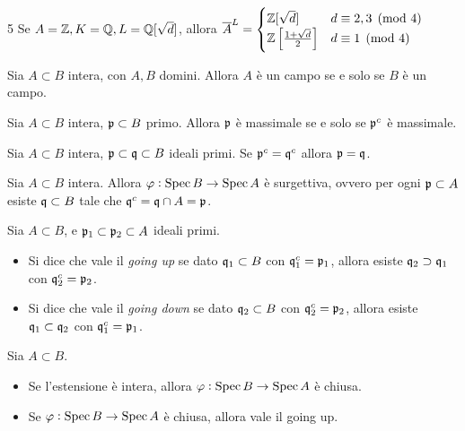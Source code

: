 \begin{example}
5    Se $A=\mathbb{Z}, K=\mathbb{Q}, L=\mathbb{Q}[\sqrt d]$, allora $\overline{A}^L=\begin{cases}
    \mathbb{Z}[\sqrt d] & d\equiv 2,3\pmod 4 \\
    \mathbb{Z}\left[ \frac{1+\sqrt d}{2} \right] & d\equiv 1\pmod 4
    \end{cases}$
\end{example}

\begin{lemma}
    Sia $A\subset B$ intera, con $A,B$ domini. Allora $A$ è un campo se e solo se $B$ è un campo.
\end{lemma}

\begin{corollary}
    Sia $A\subset B$ intera, $\mathfrak{p}\subset B$ primo. Allora $\mathfrak{p}$ è massimale se e solo se $\mathfrak{p}^c$ è massimale.
\end{corollary}

\begin{lemma}
    Sia $A\subset B$ intera, $\mathfrak{p}\subset \mathfrak{q}\subset B$ ideali primi. Se $\mathfrak{p}^c=\mathfrak{q}^c$ allora $\mathfrak{p}=\mathfrak{q}$.
\end{lemma}

\begin{theorem}
    Sia $A\subset B$ intera. Allora $\varphi:\operatorname{Spec} B\to\operatorname{Spec} A$ è surgettiva, ovvero per ogni $\mathfrak{p}\subset A$ esiste $\mathfrak{q}\subset B$ tale che $\mathfrak{q}^c=\mathfrak{q}\cap A=\mathfrak{p}$.
\end{theorem}

\begin{definition} Sia $A\subset B$, e $\mathfrak{p}_1\subset \mathfrak{p}_2\subset A$ ideali primi.
    \begin{itemize}
        \item Si dice che vale il \emph{going up} se dato $\mathfrak{q}_1\subset B$ con $\mathfrak{q}_1^c=\mathfrak{p}_1$, allora esiste $\mathfrak{q}_2\supset\mathfrak{q}_1$ con $\mathfrak{q}_2^c=\mathfrak{p}_2$.
        \item Si dice che vale il \emph{going down} se dato $\mathfrak{q}_2\subset B$ con $\mathfrak{q}_2^c=\mathfrak{p}_2$, allora esiste $\mathfrak{q}_1\subset\mathfrak{q}_2$ con $\mathfrak{q}_1^c=\mathfrak{p}_1$.
    \end{itemize}
\end{definition}

\begin{theorem} Sia $A\subset B$.
    \begin{itemize}
        \item Se l'estensione è intera, allora $\varphi: \operatorname{Spec} B\to\operatorname{Spec} A$ è chiusa.
        \item Se $\varphi: \operatorname{Spec} B\to\operatorname{Spec} A$ è chiusa, allora vale il going up.
    \end{itemize}
\end{theorem}

